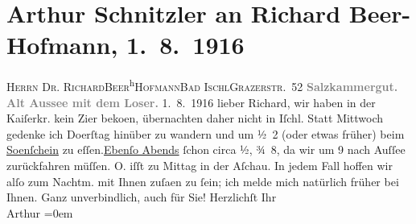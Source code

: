 

         
         \renewcommand{\erwaehntePersonen}{Personen: Richard Beer-Hofmann, Olga Schnitzler}
         \renewcommand{\erwaehnteOrte}{Orte: Altaussee, Aschau, Bad Ischl, Grazer Straße, Hotel Kaiserkrone, Loser, Restaurant Sonnenschein, Salzkammergut}
         \renewcommand{\erwaehnteWerke}{}
               \section[Arthur Schnitzler an Richard Beer-Hofmann, 1. 8. 1916]{ Arthur Schnitzler an Richard Beer-Hofmann, 1. 8. 1916}\nopagebreak{}\rehead{ }\begin{ledgroupsized}[t]{13cm}\normalsize\beginnumbering \toendnotes[C]{\smallbreak\pagebreak[2]} 
\pstart{}{\pb}\textsc{Herrn Dr. Richard}\pend{}\pstart{}\textsc{Beer}\substVorne{}\textsuperscript{h}\substDazwischen{}\textsc{H}\substHinten{}\textsc{ofmann}\pend{}\pstart{}\textsc{Bad Ischl}\pend{}\pstart{}\textsc{Grazerstr. 52}\pend{}{\bigskip}\pstart
           \noindent{}\centering{}{\pb}\textcolor{gray}{\textbf{Salzkammergut. Alt Aussee mit dem Loser.}}\pend
           \pstart
           \raggedleft{}{\pb}1. 8. 1916\pend
           \pstart
           lieber Richard, wir haben in der Kaiſerkr. kein Zi{\geminationm}er beko{\geminationm}en, übernachten daher nicht in Iſchl. Statt Mittwoch gedenke ich Do{\geminationn}erſtag hinüber zu wandern und um
                  ½ 2 (oder etwas früher) beim \uline{So{\geminationn}enſchein} zu eſſen.\strikeout{)}{ }\uline{Ebenſo Abends} ſchon circa ½, ¾ 8, da wir
               um 9 nach Auſſee zurückfahren
               müſſen. O. iſſt zu Mittag in der Aſchau. In jedem Fall hoffen wir alſo zum
               Nachtm. mit Ihnen zuſa{\geminationm}en zu ſein; ich melde mich
               natürlich früher {\pb}bei Ihnen. Ganz unverbindlich, auch
               für Sie!\pend
           \pstart
           Herzlichſt Ihr{\\[\baselineskip]}\spacefill\mbox{Arthur}\pend
           \leftskip=0em{}
         
         \endnumbering{}\end{ledgroupsized}  \newcommand{\dateiname}{L02236}\newcommand{\titel}{Arthur Schnitzler an Richard Beer-Hofmann, 1. 8. 1916}\newcommand{\editorInnen}{Martin Anton Müller und Gerd-Hermann Susen}
      
